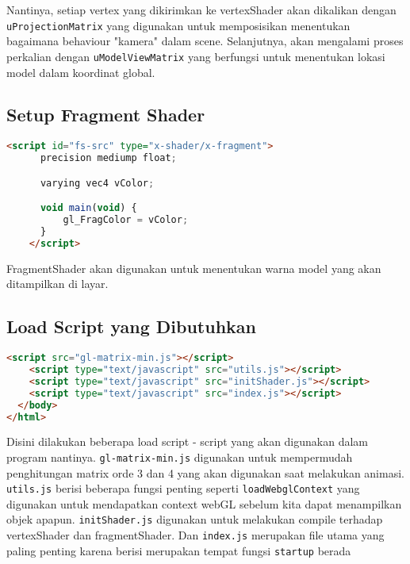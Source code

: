 Nantinya, setiap vertex yang dikirimkan ke vertexShader akan dikalikan dengan \texttt{uProjectionMatrix} yang digunakan untuk memposisikan menentukan bagaimana behaviour "kamera" dalam scene. Selanjutnya, akan mengalami proses perkalian dengan \texttt{uModelViewMatrix} yang berfungsi untuk menentukan lokasi model dalam koordinat global.

\subsection*{Setup Fragment Shader}

\begin{lstlisting}[language=html, label={lst: fragmentShader}, caption={file fragmentShader}]
    <script id="fs-src" type="x-shader/x-fragment">
      precision mediump float;

      varying vec4 vColor;

      void main(void) {
          gl_FragColor = vColor;
      }
    </script>

\end{lstlisting}

FragmentShader akan digunakan untuk menentukan warna model yang akan ditampilkan di layar.

\subsection*{Load Script yang Dibutuhkan}

\begin{lstlisting}[language=html, label={lst: neccessary script}, caption={file Load Script}]
    <script src="gl-matrix-min.js"></script>
    <script type="text/javascript" src="utils.js"></script>
    <script type="text/javascript" src="initShader.js"></script>
    <script type="text/javascript" src="index.js"></script>
  </body>
</html>
\end{lstlisting}

Disini dilakukan beberapa load script - script yang akan digunakan dalam program nantinya. \texttt{gl-matrix-min.js} digunakan untuk mempermudah penghitungan matrix orde 3 dan 4 yang akan digunakan saat melakukan animasi. \texttt{utils.js} berisi beberapa fungsi penting seperti \texttt{loadWebglContext} yang digunakan untuk mendapatkan context webGL sebelum kita dapat menampilkan objek apapun. \texttt{initShader.js} digunakan untuk melakukan compile terhadap vertexShader dan fragmentShader. Dan \texttt{index.js} merupakan file utama yang paling penting karena berisi merupakan tempat fungsi \texttt{startup} berada

